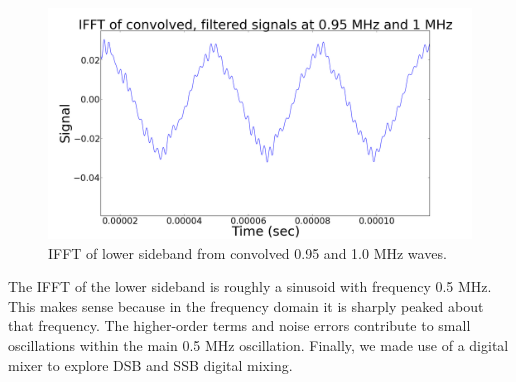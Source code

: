 \documentclass[11pt]{article}
\begin{document}
\begin{figure}
\centering
\includegraphics[scale=0.35]{pictures/ifft}
\caption{IFFT of lower sideband from convolved 0.95 and 1.0 MHz waves. \label{ifft}}
\end{figure}

The IFFT of the lower sideband is roughly a sinusoid with frequency 0.5 MHz. This makes sense because in the frequency domain it is sharply peaked about that frequency. The higher-order terms and noise errors contribute to small oscillations within the main 0.5 MHz oscillation. Finally, we made use of a digital mixer to explore DSB and SSB digital mixing. 



\end{document}
